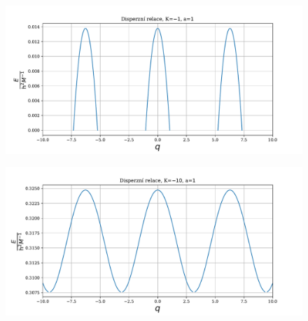 \documentclass[10pt,a4paper]{article}
\begin{document}
\begin{figure}[h!]
    \centering
    \includegraphics[scale=0.65]{disperzni-1_neg.pdf}
    \label{}
\end{figure}

\begin{figure}[h!]
    \centering
    \includegraphics[scale=0.65]{disperzni-10_neg.pdf}
    \label{}
\end{figure}
\end{document}

